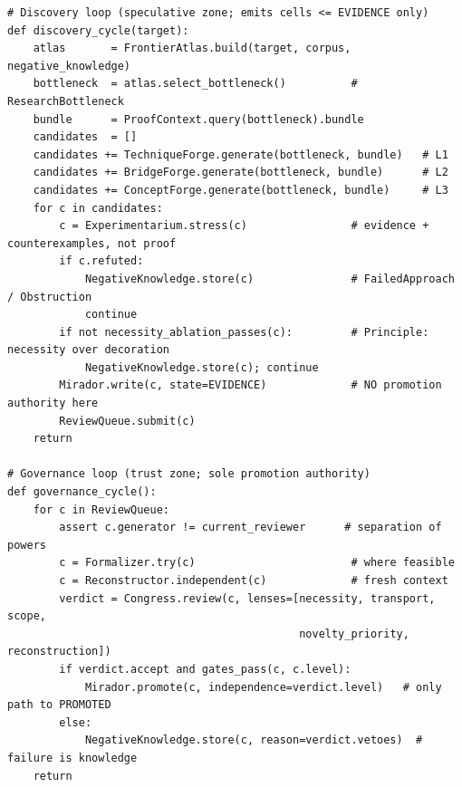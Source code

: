 \documentclass[11pt]{article}
\theoremstyle{definition}
\theoremstyle{remark}
\begin{document}
{\footnotesize\begin{verbatim}
# Discovery loop (speculative zone; emits cells <= EVIDENCE only)
def discovery_cycle(target):
    atlas       = FrontierAtlas.build(target, corpus, negative_knowledge)
    bottleneck  = atlas.select_bottleneck()          # ResearchBottleneck
    bundle      = ProofContext.query(bottleneck).bundle
    candidates  = []
    candidates += TechniqueForge.generate(bottleneck, bundle)   # L1
    candidates += BridgeForge.generate(bottleneck, bundle)      # L2
    candidates += ConceptForge.generate(bottleneck, bundle)     # L3
    for c in candidates:
        c = Experimentarium.stress(c)                # evidence + counterexamples, not proof
        if c.refuted:
            NegativeKnowledge.store(c)               # FailedApproach / Obstruction
            continue
        if not necessity_ablation_passes(c):         # Principle: necessity over decoration
            NegativeKnowledge.store(c); continue
        Mirador.write(c, state=EVIDENCE)             # NO promotion authority here
        ReviewQueue.submit(c)
    return

# Governance loop (trust zone; sole promotion authority)
def governance_cycle():
    for c in ReviewQueue:
        assert c.generator != current_reviewer      # separation of powers
        c = Formalizer.try(c)                        # where feasible
        c = Reconstructor.independent(c)             # fresh context
        verdict = Congress.review(c, lenses=[necessity, transport, scope,
                                             novelty_priority, reconstruction])
        if verdict.accept and gates_pass(c, c.level):
            Mirador.promote(c, independence=verdict.level)   # only path to PROMOTED
        else:
            NegativeKnowledge.store(c, reason=verdict.vetoes)  # failure is knowledge
    return
\end{verbatim}}
\end{document}
